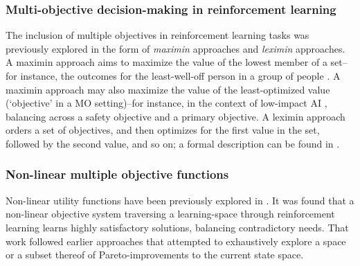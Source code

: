 \subsubsection{Multi-objective decision-making in reinforcement learning}
The inclusion of multiple objectives in reinforcement learning tasks was previously explored \cite{vamplew_human-aligned_2018,vamplew_potential-based_2021}  in the form of  \textit{maximin} approaches and \textit{leximin} approaches.
A maximin approach aims to maximize the value of the lowest member of a set--for instance, the outcomes for the least-well-off person in a group of people \cite{rawls2001justice}. A maximin approach may also maximize the value of the least-optimized value (`objective' in a MO setting)--for instance, in the context of low-impact AI \cite{vamplew_potential-based_2021}, balancing across a safety objective
and a primary objective. A leximin approach orders a set of objectives, and then optimizes for the first value in the set, followed by the second value, and so on; a formal description can be found in \cite{vamplew_human-aligned_2018}.

\subsubsection{Non-linear multiple objective functions}
Non-linear utility functions have been previously explored in \cite{rolf_need_2020}. It was found that a non-linear objective system traversing a learning-space through reinforcement learning learns highly satisfactory solutions, balancing contradictory needs. That work followed earlier approaches that attempted to exhaustively explore \cite{van2014multi,parisi2016multi} a space or a subset thereof \cite{barrett2008learning} of Pareto-improvements to the current state space.

